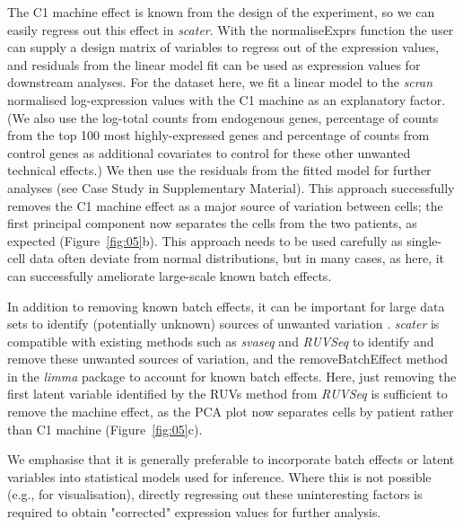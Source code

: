 \documentclass[10pt,letterpaper]{article}
\begin{document}
The C1 machine effect is known from the design of the experiment, so we
can easily regress out this effect in \emph{scater}. With the
normaliseExprs function the user can supply a design matrix of variables
to regress out of the expression values, and residuals from the linear
model fit can be used as expression values for downstream analyses. For
the dataset here, we fit a linear model to the \emph{scran} normalised
log-expression values with the C1 machine as an explanatory factor. (We
also use the log-total counts from endogenous genes, percentage of
counts from the top 100 most highly-expressed genes and percentage of
counts from control genes as additional covariates to control for these other unwanted technical effects.) We then use the
residuals from the fitted model for further analyses (see Case Study in
Supplementary Material). This approach successfully removes the C1
machine effect as a major source of variation between cells; the first
principal component now separates the cells from the two patients, as
expected (Figure~\ref{fig:05}b). This approach needs to be used carefully
as single-cell data often deviate from normal distributions, but in many
cases, as here, it can successfully ameliorate large-scale known batch
effects.

In addition to removing known batch effects, it can be important for
large data sets to identify (potentially unknown) sources of unwanted variation
\citep{Leek2010-nq,Hicks2015-qy,Grun2015-xi}.
\emph{scater} is compatible with existing methods such as \emph{svaseq}
\citep{Leek2007-rg,Leek2014-nu} and \emph{RUVSeq} \citep{Risso2014-np} to
identify and remove these unwanted sources of variation, and the
removeBatchEffect method in the \emph{limma} package \citep{Ritchie2015-so}
to account for known batch effects. Here, just removing the first latent
variable identified by the RUVs method from \emph{RUVSeq} is sufficient to
remove the machine effect, as the PCA plot now separates cells by patient
rather than C1 machine (Figure~\ref{fig:05}c).


We emphasise that it is generally preferable to incorporate batch effects or latent variables into statistical models used for inference. Where this is not possible (e.g., for visualisation), directly regressing out these uninteresting factors is required to obtain "corrected" expression values for further analysis.
\end{document}

